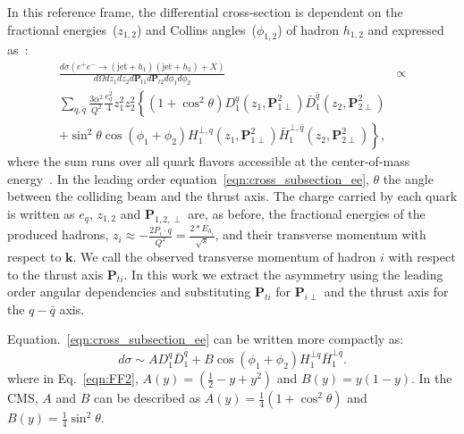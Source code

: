 In this reference frame, the differential cross-section is dependent on the fractional energies~($z_{1,2}$) and Collins angles~($\phi_{1,2}$) of hadron $h_{1,2}$ and expressed as~\cite{BoerThesis}:
\begin{equation}
\begin{aligned}
\frac{d\sigma(e^+e^-\rightarrow (\textrm{jet}+h_1)(\textrm{jet}+h_2)+X)}{d\Omega dz_1dz_2 d\boldsymbol{P}_{t1} d\boldsymbol{P}_{t2} d\phi_1d\phi_2}&\propto \\
\sum_{q,\bar{q}} \frac{3\alpha^2}{Q^2}\frac{e_q^2}{4}z^2_1z^2_2 \left\{ (1+\cos^2\theta)D_1^{q}(z_1,\boldsymbol{P}^2_{1\perp})\bar{D}_1^{\bar{q}}(z_2,\boldsymbol{P}^2_{2\perp})\right.\\  \left. +\sin^2\theta\cos(\phi_1+\phi_2)H_1^{\bot,q}(z_1,\boldsymbol{P}^2_{1\perp})\bar{H}_1^{\bot,\bar{q}}(z_2,\boldsymbol{P}^2_{2\perp})\right\},
\end{aligned}
\label{eqn:cross_subsection_ee}
\end{equation}
where the sum runs over all quark flavors accessible at the center-of-mass energy~\cite{BoerThesis}. In the leading order equation~\ref{eqn:cross_subsection_ee},  $\theta$ the angle between the colliding beam and the thrust axis.
The charge carried by each quark is written as $e_q$, $z_{1,2}$ and $\boldsymbol{P}_{1,2,\perp}$ are, as before, the fractional energies of the produced hadrons, $z_i\approx -\frac{2P_{i}\cdot q}{Q^2}=\frac{2*E_{h_i} }{\sqrt{s}}$,  and their transverse momentum with respect to $\boldsymbol{k}$. We call the observed transverse momentum of hadron $i$ with respect to the thrust axis $\boldsymbol{P}_{ti}$. In this work we extract the asymmetry using the leading order angular dependencies and substituting $\boldsymbol{P}_{ti}$ for $\boldsymbol{P}_{i\perp}$ and the thrust axis for the $q-\bar{q}$ axis. 

Equation.~\ref{eqn:cross_subsection_ee} can be written more compactly as:
\begin{equation}
d\sigma \sim A D_1^q \bar{D}_1^{\bar{q}}+B\cos(\phi_1+\phi_2)H^{\bot q}_{1}\bar{H}^{\bot \bar{q} }_{1}.
\label{eqn:FF2}
\end{equation}
\noindent where in Eq.~\eqref{eqn:FF2}, $A(y)=(\frac{1}{2}-y+y^2)$ and $B(y)=y(1-y)$. In the CMS, $A$ and $B$ can be described as $A(y)=\frac{1}{4}(1+\cos^2\theta)$ and $B(y)=\frac{1}{4}\sin^2\theta$. 



